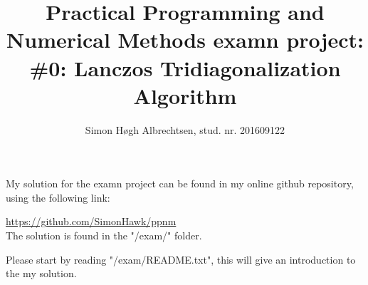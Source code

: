 \documentclass[onecolumn]{article}
\title{Practical Programming and Numerical Methods examn project:\\ \#0: Lanczos Tridiagonalization Algorithm}
\author{Simon Høgh Albrechtsen, stud. nr. 201609122}
\begin{document}
\maketitle
My solution for the examn project can be found in my online github repository, using the following link:

\url{https://github.com/SimonHawk/ppnm}\\

The solution is found in the "/exam/" folder. 

Please start by reading "/exam/README.txt", this will give an introduction to the my solution.
\end{document}
